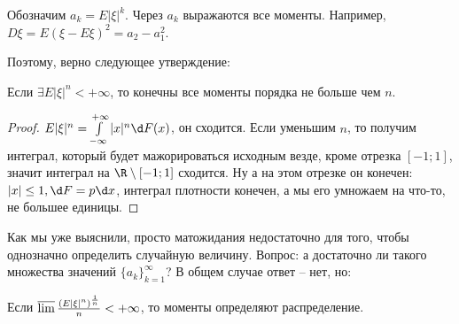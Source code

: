 Обозначим $a_k = E |\xi|^k$. 
Через $a_k$ выражаются все моменты. Например, $D\xi = E(\xi - E\xi)^2 = a_2 - a_1^2$.

Поэтому, верно следующее утверждение:
\begin{assertion}
Если $\exists E |\xi|^n < +\infty$, то конечны все моменты порядка не больше чем $n$.
\end{assertion}
\begin{proof}
$E |\xi|^n = \int\limits_{-\infty}^{+\infty} |x|^n \d F(x)$, он сходится. 
Если уменьшим $n$, то получим интеграл, который будет мажорироваться исходным везде, кроме отрезка $[-1; 1]$, значит интеграл на $\R \setminus [-1; 1]$ сходится.
Ну а на этом отрезке он конечен: $|x| \leq 1, \d F = p \d x$, интеграл плотности конечен, а мы его умножаем на что-то, не большее единицы.
\end{proof}

Как мы уже выяснили, просто матожидания недостаточно для того, чтобы однозначно определить случайную величину. 
Вопрос: а достаточно ли такого множества значений $\{a_k\}_{k=1}^\infty$?
В общем случае ответ -- нет, но:

\begin{theorem}
    Если $\varlimsup \frac{(E|\xi|^n)^\frac1n}{n} < +\infty$, то моменты определяют распределение.
\end{theorem}

